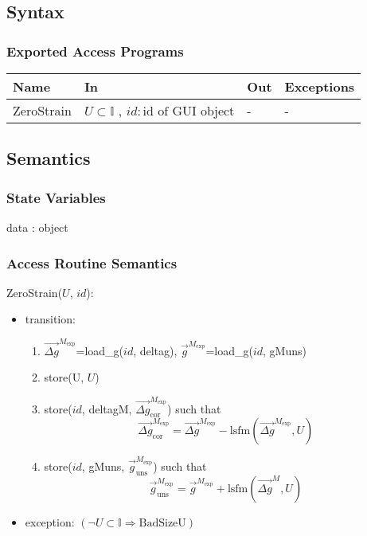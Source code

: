 \documentclass[12pt, titlepage]{article}
\begin{document}
\subsection{Syntax}

\subsubsection{Exported Access Programs}

\begin{center}
\begin{tabular}{p{2cm} p{4cm} p{4cm} p{2cm}}
\hline
\textbf{Name} & \textbf{In} & \textbf{Out} & \textbf{Exceptions} \\
\hline
ZeroStrain & $U \subset \mathbb{I}$ , $id : \text{id of GUI object}$  & - & - \\
\hline
\end{tabular}
\end{center}

\subsection{Semantics}

\subsubsection{State Variables}

data : object

\subsubsection{Access Routine Semantics}

\noindent ZeroStrain($U$, $id$):
\begin{itemize}  
\item transition:
	\begin{enumerate}
	\item $\overrightarrow{\Delta g}^{M_{\text{exp}}}$=load{\_}g($id$, deltag), 
$\overrightarrow{g}^{M_{\text{exp}}}$=load{\_}g($id$, gMuns)
	\item store(U, $U$)
	\item store($id$, deltagM, $\overrightarrow{\Delta 
g}_{\text{cor}}^{M_{\text{exp}}}$) such that
	\begin{equation*}
\overrightarrow{\Delta g}_{\text{cor}}^{M_{\text{exp}}} = \overrightarrow{\Delta 
g}^{M_{\text{exp}}} - \text{lsfm}(\overrightarrow{\Delta g}^{M_{\text{exp}}},U)
	\end{equation*}
	\item store($id$, gMuns, $\overrightarrow{g}_{\text{uns}}^{M_{\text{exp}}}$) 
such that
	\begin{equation*}
\overrightarrow{g}_{\text{uns}}^{M_{\text{exp}}} = 
\overrightarrow{g}^{M_{\text{exp}}} + \text{lsfm}(\overrightarrow{\Delta g}^M,U)
	\end{equation*}
	\end{enumerate}	 
\item exception:\newline
$(\neg U \subset \mathbb{I} \Rightarrow \text{BadSizeU})$
\end{itemize}
\end{document}
